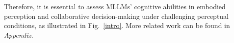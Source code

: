 \documentclass[letterpaper]{article} %
\begin{document}
%
Therefore, it is essential to assess MLLMs' cognitive abilities in embodied perception and collaborative decision-making under challenging perceptual conditions, as illustrated in Fig.~\ref{intro}. More related work can be found in \textit{Appendix}.

%

\end{document}
